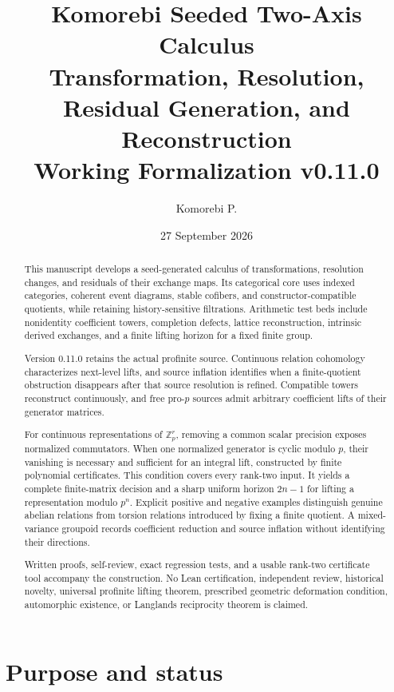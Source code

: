 \documentclass[11pt]{article}
\title{\textbf{Komorebi Seeded Two-Axis Calculus}\\
\large Transformation, Resolution, Residual Generation, and Reconstruction\\[0.4em]
\normalsize Working Formalization v0.11.0}
\author{Komorebi P.}
\date{27 September 2026}
\theoremstyle{definition}
\theoremstyle{remark}
\begin{document}
\maketitle

\begin{abstract}
This manuscript develops a seed-generated calculus of transformations, resolution changes, and residuals of their exchange maps. Its categorical core uses indexed categories, coherent event diagrams, stable cofibers, and constructor-compatible quotients, while retaining history-sensitive filtrations. Arithmetic test beds include nonidentity coefficient towers, completion defects, lattice reconstruction, intrinsic derived exchanges, and a finite lifting horizon for a fixed finite group.

Version 0.11.0 retains the actual profinite source. Continuous relation cohomology characterizes next-level lifts, and source inflation identifies when a finite-quotient obstruction disappears after that source resolution is refined. Compatible towers reconstruct continuously, and free pro-$p$ sources admit arbitrary coefficient lifts of their generator matrices.

For continuous representations of $\mathbb Z_p^r$, removing a common scalar precision exposes normalized commutators. When one normalized generator is cyclic modulo $p$, their vanishing is necessary and sufficient for an integral lift, constructed by finite polynomial certificates. This condition covers every rank-two input. It yields a complete finite-matrix decision and a sharp uniform horizon $2n-1$ for lifting a representation modulo $p^n$. Explicit positive and negative examples distinguish genuine abelian relations from torsion relations introduced by fixing a finite quotient. A mixed-variance groupoid records coefficient reduction and source inflation without identifying their directions.

Written proofs, self-review, exact regression tests, and a usable rank-two certificate tool accompany the construction. No Lean certification, independent review, historical novelty, universal profinite lifting theorem, prescribed geometric deformation condition, automorphic existence, or Langlands reciprocity theorem is claimed.
\end{abstract}
\newpage

\begingroup\small\tableofcontents\endgroup
\newpage

\section{Purpose and status}
\end{document}
